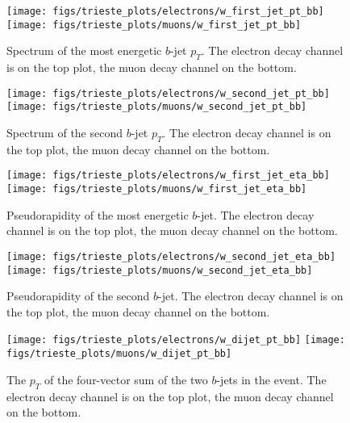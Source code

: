 \begin{figure}[htb]
	\begin{center}
		\leavevmode
		\texttt{[image: figs/trieste\_plots/electrons/w\_first\_jet\_pt\_bb]}
		\texttt{[image: figs/trieste\_plots/muons/w\_first\_jet\_pt\_bb]}
	\end{center}
	\caption{Spectrum of the most energetic $b$-jet $p_{T}$. 
          The electron decay channel is on the top plot, 
          the muon decay channel on the bottom.}
	\label{fig:1stjetpt}
\end{figure}

\begin{figure}[htb]
	\begin{center}
		\leavevmode
		\texttt{[image: figs/trieste\_plots/electrons/w\_second\_jet\_pt\_bb]}
		\texttt{[image: figs/trieste\_plots/muons/w\_second\_jet\_pt\_bb]}
	\end{center}
	\caption{Spectrum of the second $b$-jet $p_{T}$. 
          The electron decay channel is on the top plot, 
          the muon decay channel on the bottom.}
	\label{fig:2ndjetpt}
\end{figure}

\begin{figure}[htb]
	\begin{center}
		\leavevmode
		\texttt{[image: figs/trieste\_plots/electrons/w\_first\_jet\_eta\_bb]}
		\texttt{[image: figs/trieste\_plots/muons/w\_first\_jet\_eta\_bb]}
	\end{center}
	\caption{Pseudorapidity of the most energetic $b$-jet. 
          The electron decay channel is on the top plot, 
          the muon decay channel on the bottom.}
	\label{fig:1stjeteta}
\end{figure}

\begin{figure}[htb]
	\begin{center}
		\leavevmode
		\texttt{[image: figs/trieste\_plots/electrons/w\_second\_jet\_eta\_bb]}
		\texttt{[image: figs/trieste\_plots/muons/w\_second\_jet\_eta\_bb]}
	\end{center}
	\caption{Pseudorapidity of the second $b$-jet. 
          The electron decay channel is on the top plot, 
          the muon decay channel on the bottom.}
	\label{fig:2ndjeteta}
\end{figure}

\clearpage

\begin{figure}[htb]
	\begin{center}
		\leavevmode
		\texttt{[image: figs/trieste\_plots/electrons/w\_dijet\_pt\_bb]}
		\texttt{[image: figs/trieste\_plots/muons/w\_dijet\_pt\_bb]}
	\end{center}
	\caption{The $p_{T}$ of the four-vector sum of the two $b$-jets in the event. 
          The electron decay channel is on the top plot, 
          the muon decay channel on the bottom.}
	\label{fig:dijetpt}
\end{figure}

